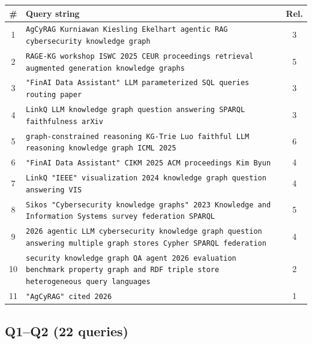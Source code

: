\documentclass[11pt,a4paper]{article}
\begin{document}
\begin{center}
\footnotesize
\begin{tabularx}{\textwidth}{@{}c>{\RaggedRight}Xc@{}}
\toprule
\textbf{\#} & \textbf{Query string} & \textbf{Rel.} \\
\midrule
1 & \texttt{AgCyRAG Kurniawan Kiesling Ekelhart agentic RAG cybersecurity knowledge graph} & 3 \\
2 & \texttt{RAGE-KG workshop ISWC 2025 CEUR proceedings retrieval augmented generation knowledge graphs} & 5 \\
3 & \texttt{"FinAI Data Assistant" LLM parameterized SQL queries routing paper} & 3 \\
4 & \texttt{LinkQ LLM knowledge graph question answering SPARQL faithfulness arXiv} & 3 \\
5 & \texttt{graph-constrained reasoning KG-Trie Luo faithful LLM reasoning knowledge graph ICML 2025} & 6 \\
6 & \texttt{"FinAI Data Assistant" CIKM 2025 ACM proceedings Kim Byun} & 4 \\
7 & \texttt{LinkQ "IEEE" visualization 2024 knowledge graph question answering VIS} & 4 \\
8 & \texttt{Sikos "Cybersecurity knowledge graphs" 2023 Knowledge and Information Systems survey federation SPARQL} & 5 \\
9 & \texttt{2026 agentic LLM cybersecurity knowledge graph question answering multiple graph stores Cypher SPARQL federation} & 4 \\
10 & \texttt{security knowledge graph QA agent 2026 evaluation benchmark property graph and RDF triple store heterogeneous query languages} & 2 \\
11 & \texttt{"AgCyRAG" cited 2026} & 1 \\
\bottomrule
\end{tabularx}
\end{center}

\subsection{Q1--Q2 (22 queries)}
\end{document}
